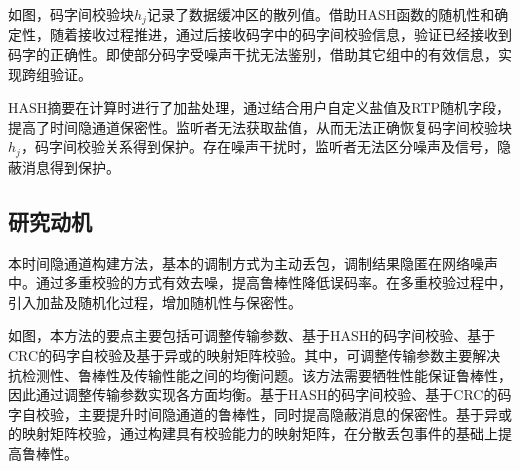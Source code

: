 如图，码字间校验块$h_{j}$记录了数据缓冲区的散列值。借助HASH函数的随机性和确定性，随着接收过程推进，通过后接收码字中的码字间校验信息，验证已经接收到码字的正确性。即使部分码字受噪声干扰无法鉴别，借助其它组中的有效信息，实现跨组验证。

HASH摘要在计算时进行了加盐处理，通过结合用户自定义盐值及RTP随机字段，提高了时间隐通道保密性。监听者无法获取盐值，从而无法正确恢复码字间校验块$h_{j}$，码字间校验关系得到保护。存在噪声干扰时，监听者无法区分噪声及信号，隐蔽消息得到保护。

\subsection{研究动机}
\label{chap:hash:motivation:motivation}

本时间隐通道构建方法，基本的调制方式为主动丢包，调制结果隐匿在网络噪声中。通过多重校验的方式有效去噪，提高鲁棒性降低误码率。在多重校验过程中，引入加盐及随机化过程，增加随机性与保密性。


如图，本方法的要点主要包括可调整传输参数、基于HASH的码字间校验、基于CRC的码字自校验及基于异或的映射矩阵校验。其中，可调整传输参数主要解决抗检测性、鲁棒性及传输性能之间的均衡问题。该方法需要牺牲性能保证鲁棒性，因此通过调整传输参数实现各方面均衡。基于HASH的码字间校验、基于CRC的码字自校验，主要提升时间隐通道的鲁棒性，同时提高隐蔽消息的保密性。基于异或的映射矩阵校验，通过构建具有校验能力的映射矩阵，在分散丢包事件的基础上提高鲁棒性。